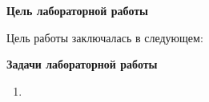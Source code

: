 \textbf{Цель лабораторной работы}
\vspace{0.5cm}

Цель работы заключалась в следующем: 


\vspace{2cm}

\textbf{Задачи лабораторной работы}
\vspace{0.5cm}

\begin{enumerate}
    \item
\end{enumerate}